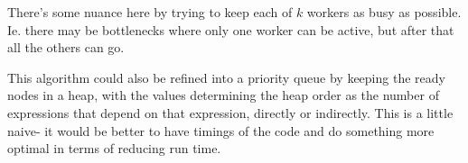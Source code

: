\documentclass[12pt]{article}
\begin{document}
There's some nuance here by trying to keep each of $k$ workers as busy as
possible. Ie. there may be bottlenecks where only one worker can be active, but
after that all the others can go.

This algorithm could also be refined into a priority queue by keeping the ready
nodes in a heap, with the values determining the heap order as the number
of expressions that depend on that expression, directly or indirectly. This
is a little naive- it would be better to have timings of the code and do
something more optimal in terms of reducing run time.

\newpage


 
\end{document}
